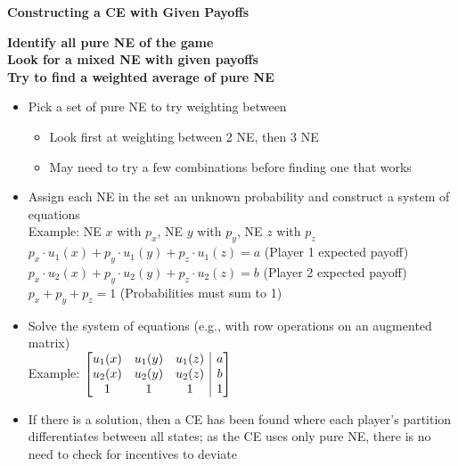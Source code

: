 \documentclass{report}
\newcommand{\FlowerSmall}{\mbox{\raisebox{-1pt}{\small\EightFlowerPetalRemoved}}} %
\begin{document}
\newpage
\begin{mdframed}
	\medskip
	\begin{center} \textbf{{\large Constructing a CE with Given Payoffs}} \end{center} \bigskip
	\textbf{Identify all pure NE of the game}\\[10pt]
	\textbf{Look for a mixed NE with given payoffs}\\[10pt]
	\textbf{Try to find a weighted average of pure NE}
	\begin{itemize}[label=\FlowerSmall]
		\item{Pick a set of pure NE to try weighting between}
			\begin{itemize}
			\item{Look first at weighting between 2 NE, then 3 NE}
			\item{May need to try a few combinations before finding one that works}
			\end{itemize}
		\item{Assign each NE in the set an unknown probability and construct a system of equations}\\[5pt]
		Example: NE $x$ with $p_x$, NE $y$ with $p_y$, NE $z$ with $p_z$\\[5pt]
		$p_x \cdot u_1(x) + p_y \cdot u_1(y) + p_z \cdot u_1(z) = a$ \hspace{10pt} (Player 1 expected payoff)\\
		$p_x \cdot u_2(x) + p_y \cdot u_2(y) + p_z \cdot u_2(z) = b$ \hspace{10pt} (Player 2 expected payoff)\\
		$p_x + p_y + p_z = 1$ \hspace{101pt} (Probabilities must sum to 1) \smallskip
	\item{Solve the system of equations (e.g., with row operations on an augmented matrix)}\\[5pt]
	Example: $\left[ \begin{array}{@{} c c c | c @{}}
		u_1(x) & u_1(y) & u_1(z) & a\\
		u_2(x) & u_2(y) & u_2(z) & b\\
		1 & 1 & 1 & 1
	\end{array} \right]$\\[3pt]
	\item{If there is a solution, then a CE has been found where each player's partition differentiates between all states; as the CE uses only pure NE, there is no need to check for incentives to deviate}
	\end{itemize}

\end{mdframed}
\end{document}

